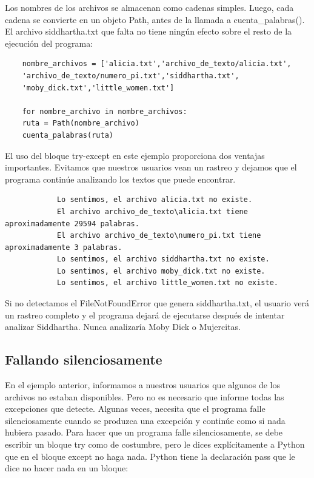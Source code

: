 Los nombres de los archivos se almacenan como cadenas simples. Luego, cada cadena se convierte en un objeto 
{\ttfamily Path}, antes de la llamada a {\ttfamily cuenta\_palabras()}. El archivo {\ttfamily siddhartha.txt} que falta no tiene ningún efecto sobre el resto de la ejecución del programa:

\begin{lstlisting}
	nombre_archivos = ['alicia.txt','archivo_de_texto/alicia.txt',
	'archivo_de_texto/numero_pi.txt','siddhartha.txt',
	'moby_dick.txt','little_women.txt']
	
	for nombre_archivo in nombre_archivos:
	ruta = Path(nombre_archivo)
	cuenta_palabras(ruta)
\end{lstlisting}

El uso del bloque {\ttfamily try-except} en este ejemplo proporciona dos ventajas importantes. 
Evitamos que nuestros usuarios vean un rastreo y dejamos que el programa continúe analizando los textos
que puede encontrar. 

{\ttfamily\scriptsize\scriptsize 
	\hspace{-0.65cm} \vspace{-0.3cm}	
	{\color{blue} 	
		\begin{verbatim}
			Lo sentimos, el archivo alicia.txt no existe.
			El archivo archivo_de_texto\alicia.txt tiene aproximadamente 29594 palabras.
			El archivo archivo_de_texto\numero_pi.txt tiene aproximadamente 3 palabras.
			Lo sentimos, el archivo siddhartha.txt no existe.
			Lo sentimos, el archivo moby_dick.txt no existe.
			Lo sentimos, el archivo little_women.txt no existe.
		\end{verbatim}
}}

Si no detectamos el {\ttfamily FileNotFoundError} que genera {\ttfamily siddhartha.txt}, el usuario verá un rastreo completo y el programa dejará de ejecutarse después de intentar analizar Siddhartha. Nunca analizaría Moby Dick o Mujercitas.

\subsection{Fallando silenciosamente}

En el ejemplo anterior, informamos a nuestros usuarios que algunos de los archivos no estaban disponibles. Pero no es necesario que informe todas las excepciones que detecte. Algunas  veces, necesita  que el programa falle silenciosamente cuando se produzca una excepción y continúe como si nada hubiera pasado. Para hacer que un programa falle silenciosamente, se debe escribir un bloque {\ttfamily try} como de costumbre, pero le dices explícitamente a Python que en el bloque {\ttfamily except} no haga nada. Python tiene la declaración {\ttfamily pass} que le dice  no hacer nada en un bloque:

